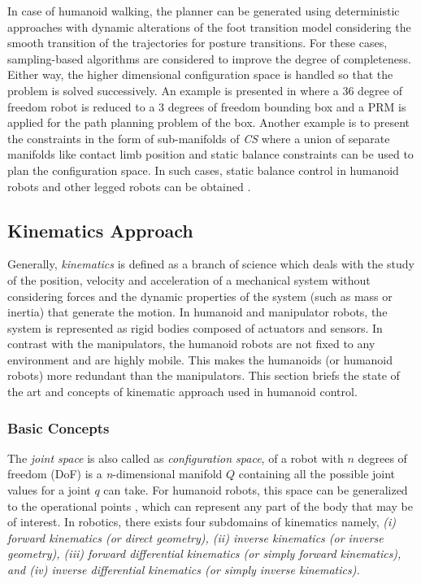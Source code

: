  

In case of humanoid walking, the planner can be generated using deterministic approaches with dynamic alterations of the foot transition model considering
the smooth transition of the trajectories for posture transitions. For these cases, sampling-based algorithms are considered to improve the degree of completeness.
Either way, the higher dimensional configuration space is handled so that the problem is solved successively. An example is presented in \cite{yoshida2008planning} where a 36 degree of freedom
robot is reduced to a 3 degrees of freedom bounding box and a PRM is applied for the path planning problem of the box. Another example is to present the
constraints in the form of sub-manifolds of \textit{CS} where a union of separate manifolds like contact limb position and static balance constraints can be 
used to plan the configuration space. In such cases, static balance control in humanoid robots and other legged robots can be obtained \cite{hauser2010multi}.

\subsection{Kinematics Approach}

Generally, \textit{kinematics} is defined as a branch of science which deals with the study of the position, velocity and acceleration of a mechanical system without
considering forces and the dynamic properties of the system (such as mass or inertia) that generate the motion. In humanoid and manipulator robots, the system is 
represented as rigid bodies composed of actuators and sensors. In contrast with the manipulators, the humanoid robots are not fixed to any environment and are highly mobile.
This makes the humanoids (or humanoid robots) more redundant than the manipulators. This section briefs the state of the art and concepts of kinematic approach used in
humanoid control.

\subsubsection{Basic Concepts}

The \textit{joint space} is also called as \textit{configuration space}, of a robot with $n$ degrees of freedom (DoF) is a \textit{n}-dimensional manifold $\mathit{Q}$ containing 
all the possible joint values for a joint $q$ can take. For humanoid robots, this space can be generalized to the operational points \cite{khatib1987unified}, which can represent any part of the body
that may be of interest. In robotics, there exists four subdomains of kinematics namely,  \textit{\textit{(i)} forward kinematics (or direct geometry), \textit{(ii)} inverse kinematics
(or inverse geometry), \textit{(iii)} forward differential kinematics (or simply forward kinematics), and \textit{(iv)} inverse differential kinematics (or simply inverse kinematics).}

